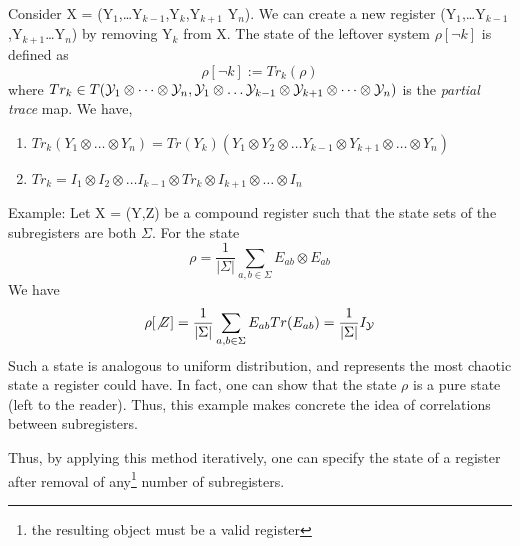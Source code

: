 \noindent Consider \textsf{X} = (\textsf{Y}$_1$,\dots \textsf{Y}$_{k-1}$,\textsf{Y}$_{k}$,\textsf{Y}$_{k+1}$ \textsf{Y}$_n$). We can create a new register (\textsf{Y}$_1$,\dots \textsf{Y}$_{k-1}$,\textsf{Y}$_{k+1}$\dots  \textsf{Y}$_n$) by removing \textsf{Y}$_k$ from \textsf{X}. The state of the leftover system $\rho[\neg k]$ is defined as 
\[\rho[\neg k] := Tr_k(\rho)\]
where $Tr_k \in T(\mathcal{Y}_1\otimes\dots\otimes\mathcal{Y}_n,\mathcal{Y}_1\otimes\dots\mathcal{Y}_{k-1}\otimes\mathcal{Y}_{k+1}\otimes\dots\otimes\mathcal{Y}_n)$ is the \textit{partial trace} map. We have,
\begin{enumerate}
    \item $Tr_k(Y_1\otimes\dots\otimes Y_n) = Tr(Y_k)(Y_1\otimes Y_2\otimes\dots Y_{k-1}\otimes Y_{k+1} \otimes\dots\otimes Y_n)$
    \item $Tr_k = I_1\otimes I_2\otimes \dots I_{k-1}\otimes Tr_k\otimes I_{k+1}\otimes \dots \otimes I_n$
\end{enumerate}
Example: Let \textsf{X} = (\textsf{Y},\textsf{Z}) be a compound register such that the state sets of the subregisters are both $\Sigma$. For the state
\[\rho = \frac{1}{|\Sigma|}\sum_{a,b\in\Sigma}E_{ab}\otimes E_{ab}\]
We have
\[\rho[\not Z] = \frac{1}{|\Sigma|}\sum_{a,b\in\Sigma}E_{ab}Tr( E_{ab}) = \frac{1}{|\Sigma|}I_{\mathcal{Y}}\]
Such a state is analogous to uniform distribution, and represents the most chaotic state a register could have. In fact, one can show that the state $\rho$ is a pure state (left to the reader). Thus, this example makes concrete the idea of correlations between subregisters.

\noindent Thus, by applying this method iteratively, one can specify the state of a register after removal of any\footnote{the resulting object must be a valid register} number of subregisters. 

